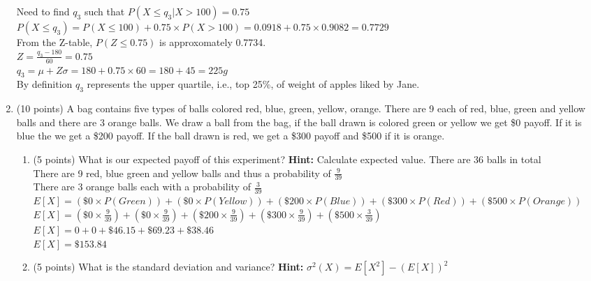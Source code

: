 \documentclass{article}%
\begin{document}
\begin{enumerate}
    Need to find $q_3$ such that $P(X \leq q_3 | X > 100) = 0.75$ \\

    $P(X \leq q_3) = P(X \leq 100) + 0.75 \times P(X > 100) = 0.0918 + 0.75 \times 0.9082 = 0.7729$\\
    From the Z-table, $P(Z \leq 0.75)$ is approxomately 0.7734.\\
    $Z = \frac{q_3 - 180}{60} = 0.75$\\

    $q_3 = \mu + Z \sigma = 180 + 0.75 \times 60 = 180 + 45 = 225g$\\

    By definition $q_3$ represents the upper quartile, i.e., top 25\%, of weight of apples liked by Jane.

    \item (10 points) A bag contains five types of balls colored red, blue, green, yellow, orange. There are 9 each of red, blue, green and yellow balls and there are 3 orange balls. We draw a ball from the bag, if the ball drawn is colored green or yellow we get \$0 payoff. If it is blue the we get a \$200 payoff. If the ball drawn is red, we get a \$300 payoff and \$500 if it is orange.
    \begin{enumerate}
        \item (5 points) What is our expected payoff of this experiment? \textbf{Hint:} Calculate expected value.
        There are 36 balls in total\\
        There are 9 red, blue green and yellow balls and thus a probability of $\frac{9}{39}$\\
        There are 3 orange balls each with a probability of $\frac{3}{39}$\\
        $E[X] = (\$0 \times P(Green)) + (\$0 \times P(Yellow)) + (\$200 \times P(Blue)) + (\$300 \times P(Red)) + (\$500 \times P(Orange))$\\
        $E[X] = (\$0 \times \frac{9}{39}) + (\$0 \times \frac{9}{39}) + (\$200 \times \frac{9}{39}) + (\$300 \times \frac{9}{39}) + (\$500 \times \frac{3}{39})$\\
        $E[X] = 0 + 0 + \$46.15 + \$69.23 + \$38.46$\\
        $E[X] = \$153.84$\\
    
        \item (5 points) What is the standard deviation and variance? \textbf{Hint:} $\sigma^2(X) = E[X^2] - (E[X])^2$
        

\end{enumerate}
\end{enumerate}
\end{document}
